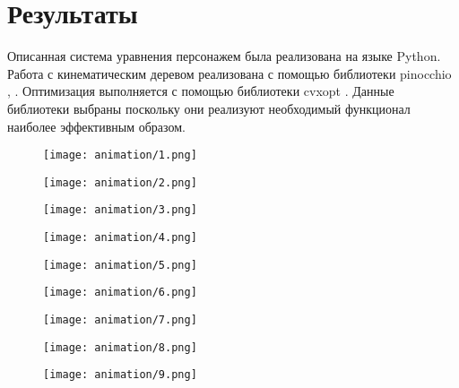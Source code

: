 \section{Результаты}

Описанная система уравнения персонажем была реализована на языке Python. Работа с кинематическим деревом реализована с помощью библиотеки pinocchio \cite{Carpentier}, \cite{Pinocchio}. Оптимизация выполняется с помощью библиотеки cvxopt \cite{CVXOPT}. Данные библиотеки выбраны поскольку они реализуют необходимый функционал наиболее эффективным образом.

\begin{figure}
  \hfill
  \begin{minipage}{0.326\textwidth}
    \centering
    \texttt{[image: animation/1.png]}
  \end{minipage}
  \begin{minipage}{0.326\textwidth}
    \centering
    \texttt{[image: animation/2.png]}
  \end{minipage}
  \begin{minipage}{0.326\textwidth}
    \centering
    \texttt{[image: animation/3.png]}
  \end{minipage}
  \vfill
  \hfill
  \begin{minipage}{0.326\textwidth}
    \centering
    \texttt{[image: animation/4.png]}
  \end{minipage}
  \begin{minipage}{0.326\textwidth}
    \centering
    \texttt{[image: animation/5.png]}
  \end{minipage}
  \begin{minipage}{0.326\textwidth}
    \centering
    \texttt{[image: animation/6.png]}
  \end{minipage}
  \vfill
  \hfill
  \begin{minipage}{0.326\textwidth}
    \centering
    \texttt{[image: animation/7.png]}
  \end{minipage}
  \begin{minipage}{0.326\textwidth}
    \centering
    \texttt{[image: animation/8.png]}
  \end{minipage}
  \begin{minipage}{0.326\textwidth}
    \centering
    \texttt{[image: animation/9.png]}
  \end{minipage}
  \vfill
  \hfill
  \begin{minipage}{0.326\textwidth}

\end{minipage}
\end{figure}
